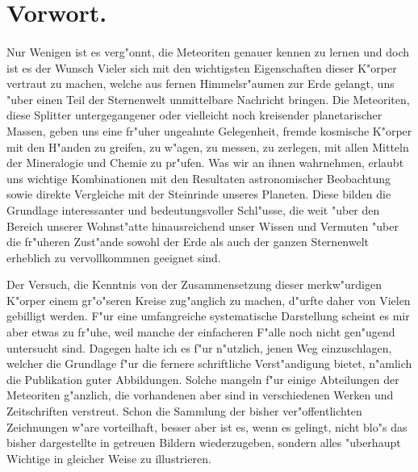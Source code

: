 \documentclass[a4paper, 11pt, oneside, polutonikogreek, german]{article}
\begin{document}
\section{Vorwort.}
\paragraph*{}
Nur Wenigen ist es verg"onnt, die Meteoriten genauer kennen zu lernen und doch ist es der Wunsch Vieler sich mit den wichtigsten Eigenschaften dieser K"orper vertraut zu machen, welche aus fernen Himmelsr"aumen zur Erde gelangt, uns "uber einen Teil der Sternenwelt unmittelbare Nachricht bringen. Die Meteoriten, diese Splitter untergegangener oder vielleicht noch kreisender planetarischer Massen, geben uns eine fr"uher ungeahnte Gelegenheit, fremde kosmische K"orper mit den H"anden zu greifen, zu w"agen, zu messen, zu zerlegen, mit allen Mitteln der Mineralogie und Chemie zu pr"ufen. Was wir an ihnen wahrnehmen, erlaubt uns wichtige Kombinationen mit den Resultaten astronomischer Beobachtung sowie direkte Vergleiche mit der Steinrinde unseres Planeten. Diese bilden die Grundlage interessanter und bedeutungsvoller Schl"usse, die weit "uber den Bereich unserer Wohnst"atte hinausreichend unser Wissen und Vermuten "uber die fr"uheren Zust"ande sowohl der Erde als auch der ganzen Sternenwelt erheblich zu vervollkommnen geeignet sind.

Der Versuch, die Kenntnis von der Zusammensetzung dieser merkw"urdigen K"orper einem gr"o"seren Kreise zug"anglich zu machen, d"urfte daher von Vielen gebilligt werden. F"ur eine umfangreiche systematische Darstellung scheint es mir aber etwas zu fr"uhe, weil manche der einfacheren F"alle noch nicht gen"ugend untersucht sind. Dagegen halte ich es f"ur n"utzlich, jenen Weg einzuschlagen, welcher die Grundlage f"ur die fernere schriftliche Verst"andigung bietet, n"amlich die Publikation guter Abbildungen. Solche mangeln f"ur einige Abteilungen der Meteoriten g"anzlich, die vorhandenen aber sind in verschiedenen Werken und Zeitschriften verstreut. Schon die Sammlung der bisher ver"offentlichten Zeichnungen w"are vorteilhaft, besser aber ist es, wenn es gelingt, nicht blo"s das bisher dargestellte in getreuen Bildern wiederzugeben, sondern alles "uberhaupt Wichtige in gleicher Weise zu illustrieren.
\end{document}
